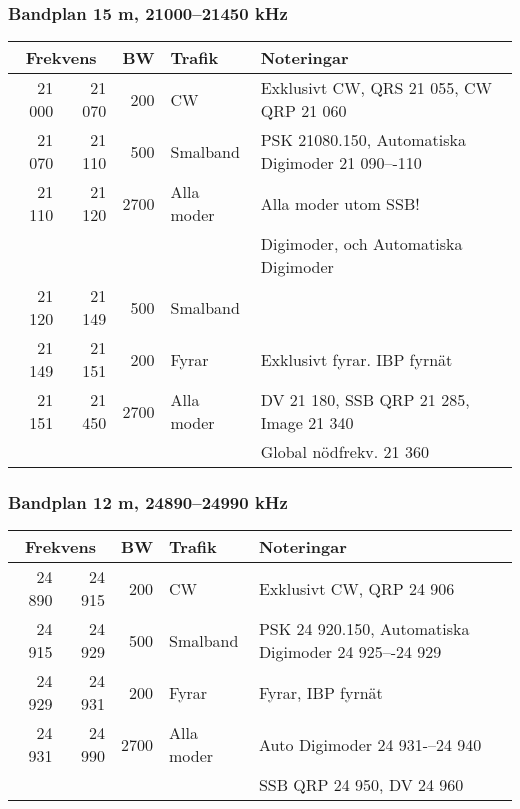 \begin{landscape}
\subsubsection{Bandplan 15 m, 21000--21450 kHz}
\begin{tabular}{rrrll}
\multicolumn{2}{c}{\textbf{Frekvens}} & \textbf{BW} & \textbf{Trafik} & \textbf{Noteringar} \\ \hline
21 000 & 21 070 & 200  & CW         & Exklusivt CW, QRS 21 055, CW QRP 21 060          \\ \hline
21 070 & 21 110 & 500  & Smalband   & PSK 21080.150, Automatiska Digimoder 21 090–-110 \\
21 110 & 21 120 & 2700 & Alla moder & Alla moder utom SSB!                             \\
       &        &      &            & Digimoder, och Automatiska Digimoder             \\ \hline
21 120 & 21 149 & 500  & Smalband   &                                                  \\ \hline
21 149 & 21 151 & 200  & Fyrar      & Exklusivt fyrar. IBP fyrnät                      \\ \hline
21 151 & 21 450 & 2700 & Alla moder & DV 21 180, SSB QRP 21 285, Image 21 340          \\
       &        &      &            & Global nödfrekv. 21 360                          \\ \hline
\end{tabular}

\subsubsection{Bandplan 12 m, 24890--24990 kHz}
\begin{tabular}{rrrll}
\multicolumn{2}{c}{\textbf{Frekvens}} & \textbf{BW} & \textbf{Trafik} & \textbf{Noteringar} \\ \hline
24 890 & 24 915 & 200  & CW         & Exklusivt CW, QRP 24 906                             \\ \hline
24 915 & 24 929 & 500  & Smalband   & PSK 24 920.150, Automatiska Digimoder 24 925–-24 929 \\ \hline
24 929 & 24 931 & 200  & Fyrar      & Fyrar, IBP fyrnät                                    \\ \hline
24 931 & 24 990 & 2700 & Alla moder & Auto Digimoder 24 931-–24 940                        \\
       &        &      &            & SSB QRP 24 950, DV 24 960                            \\ \hline
\end{tabular}


\end{landscape}
